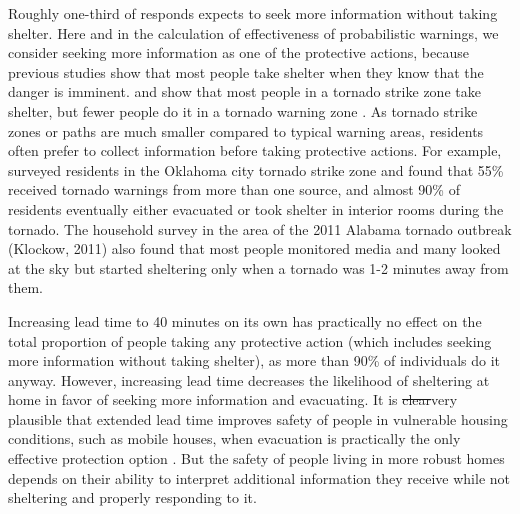 \documentclass{ametsocV6.1}
\newcommand{\add}[1]{{\color{red}#1}}
\begin{document}
Roughly one-third of responds expects to seek more information without taking shelter. \add{Here and in the calculation of effectiveness of probabilistic warnings, we consider seeking more information as one of the protective actions, because previous studies show that most people take shelter when they know that the danger is imminent. \citet{hammer_response_2002} and \citet{klockow_investigation_2011} show that most people in a tornado strike zone take shelter, but fewer people do it in a tornado warning zone \citep*{liu_assessment_1996, sherman-morris_tornado_2010}.} As tornado strike zones or paths are much smaller compared to typical warning areas, residents often prefer to collect information before taking protective actions. For example, \citet{hammer_response_2002} surveyed residents in the Oklahoma city tornado strike zone and found that 55\% received tornado warnings from more than one source, and almost 90\% of residents eventually either evacuated or took shelter in interior rooms during the tornado. The household survey in the area of the 2011 Alabama tornado outbreak (Klockow, 2011) also found that most people monitored media and many looked at the sky but started sheltering only when a tornado was 1-2 minutes away from them.

Increasing lead time to 40 minutes on its own has practically no effect on the total proportion of people taking any protective action (which includes seeking more information without taking shelter), as more than 90\% of individuals do it anyway. However, increasing lead time decreases the likelihood of sheltering at home in favor of seeking more information and evacuating. It is \sout{clear}\add{very plausible} that extended lead time improves safety of people in vulnerable housing conditions, such as mobile houses, \add{when evacuation is practically the only effective protection option \citep{schmidlin_tornado_2009}.} But the safety of people living in more robust homes depends on their ability to interpret additional information they receive while not sheltering and properly responding to it.
\end{document}
